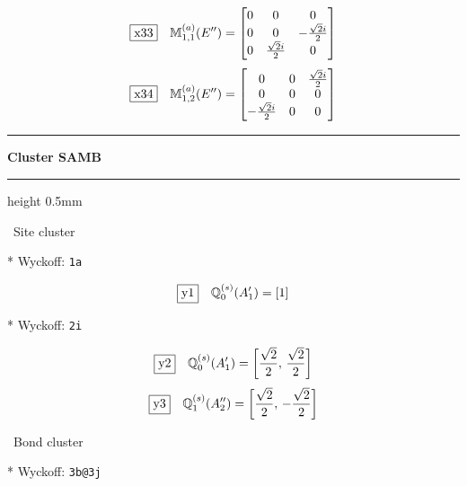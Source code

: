 \documentclass[fleqn,10pt,landscape]{jsarticle}
\begin{document}
\begin{dmath*}
\fbox{x33}\quad \mathbb{M}_{1,1}^{(a)}(E^{\prime\prime})=\begin{bmatrix} 0 & 0 & 0 \\ 0 & 0 & - \frac{\sqrt{2} i}{2} \\ 0 & \frac{\sqrt{2} i}{2} & 0 \end{bmatrix}
\end{dmath*}
\begin{dmath*}
\fbox{x34}\quad \mathbb{M}_{1,2}^{(a)}(E^{\prime\prime})=\begin{bmatrix} 0 & 0 & \frac{\sqrt{2} i}{2} \\ 0 & 0 & 0 \\ - \frac{\sqrt{2} i}{2} & 0 & 0 \end{bmatrix}
\end{dmath*}
\vspace{5mm}
\noindent \rule[0.5mm]{5mm}{0.5mm}\hspace{3mm}\textbf{Cluster SAMB}\hspace{3mm}\leaders\hrule height 0.5mm\hfill\kern0pt
\vspace{3mm}

\noindent\textbullet\, Site cluster

\vspace{5mm}

\noindent ** Wyckoff: \texttt{1a}

\begin{dmath*}
\fbox{y1}\quad \mathbb{Q}_{0}^{(s)}(A_{1}^{\prime})=\left[ 1 \right]
\end{dmath*}
\vspace{5mm}

\noindent ** Wyckoff: \texttt{2i}

\begin{dmath*}
\fbox{y2}\quad \mathbb{Q}_{0}^{(s)}(A_{1}^{\prime})=\left[ \frac{\sqrt{2}}{2},\, \frac{\sqrt{2}}{2} \right]
\end{dmath*}
\begin{dmath*}
\fbox{y3}\quad \mathbb{Q}_{1}^{(s)}(A_{2}^{\prime\prime})=\left[ \frac{\sqrt{2}}{2},\, - \frac{\sqrt{2}}{2} \right]
\end{dmath*}
\vspace{5mm}

\noindent\textbullet\, Bond cluster

\vspace{5mm}

\noindent ** Wyckoff: \texttt{3b@3j}
\end{document}
